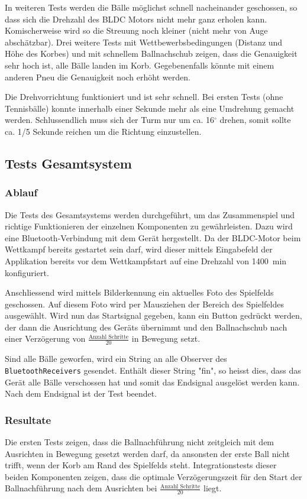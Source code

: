 \noindent
In weiteren Tests werden die Bälle möglichst schnell nacheinander geschossen, 
so dass sich die Drehzahl des BLDC Motors nicht mehr ganz erholen kann. 
Komischerweise wird so die Streuung noch kleiner (nicht mehr von Auge 
abschätzbar). Drei weitere Tests mit Wettbewerbsbedingungen (Distanz und Höhe 
des Korbes) und mit schnellem Ballnachschub zeigen, dass die Genauigkeit sehr 
hoch ist, alle Bälle landen im Korb. Gegebenenfalls könnte mit einem anderen 
Pneu die Genauigkeit noch erhöht werden.

\noindent
Die Drehvorrichtung funktioniert und ist sehr schnell. Bei ersten Tests (ohne 
Tennisbälle) konnte innerhalb einer Sekunde mehr als eine Umdrehung gemacht 
werden. Schlussendlich muss sich der Turm nur um ca. 16$^\circ$ drehen, somit 
sollte ca. 1/5 Sekunde reichen um die Richtung einzustellen.

\clearpage
\subsection{Tests Gesamtsystem}
\subsubsection{Ablauf}
Die Tests des Gesamtsystems werden durchgeführt, um das Zusammenspiel und 
richtige Funktionieren der einzelnen Komponenten zu gewährleisten. Dazu wird 
eine Bluetooth-Verbindung mit dem Gerät hergestellt. Da der BLDC-Motor beim 
Wettkampf bereits gestartet sein darf, wird dieser mittels Eingabefeld der 
Applikation bereits vor dem Wettkampfstart auf eine Drehzahl von 
1400\si{\per\minute} konfiguriert.

\noindent
Anschliessend wird mittels Bilderkennung ein aktuelles Foto des Spielfelds 
geschossen. Auf diesem Foto wird per Mausziehen der Bereich des Spielfeldes 
ausgewählt. Wird nun das Startsignal gegeben, kann ein Button gedrückt werden, 
der dann die Ausrichtung des Geräts übernimmt und den Ballnachschub nach einer 
Verzögerung von $\frac{\text{Anzahl Schritte}}{20}$ in Bewegung setzt.

\noindent
Sind alle Bälle geworfen, wird ein String an alle Observer des 
\verb?BluetoothReceivers? gesendet. Enthält dieser String "fin", so heisst 
dies, dass das Gerät alle Bälle verschossen hat und somit das Endsignal 
ausgelöst werden kann. Nach dem Endsignal ist der Test beendet.

\subsubsection{Resultate}
\noindent
Die ersten Tests zeigen, dass die Ballnachführung nicht zeitgleich mit 
dem Ausrichten in Bewegung gesetzt werden darf, da ansonsten der erste Ball 
nicht trifft, wenn der Korb am Rand des Spielfelds steht. Integrationstests 
dieser beiden Komponenten zeigen, dass die optimale Verzögerungszeit für den 
Start der Ballnachführung nach dem Ausrichten bei $\frac{\text{Anzahl 
Schritte}}{20}$ liegt. 

